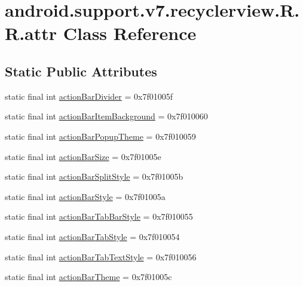 \hypertarget{classandroid_1_1support_1_1v7_1_1recyclerview_1_1_r_1_1attr}{
\section{android.support.v7.recyclerview.R.R.attr Class Reference}
\label{classandroid_1_1support_1_1v7_1_1recyclerview_1_1_r_1_1attr}
}
\subsection*{Static Public Attributes}
\begin{CompactItemize}
\item 
static final int \hyperlink{classandroid_1_1support_1_1v7_1_1recyclerview_1_1_r_1_1attr_149527b51d5ba177533c5cbede5ad832}{actionBarDivider} = 0x7f01005f
\item 
static final int \hyperlink{classandroid_1_1support_1_1v7_1_1recyclerview_1_1_r_1_1attr_90ccaf7c1a106421aefd14f90295f8bb}{actionBarItemBackground} = 0x7f010060
\item 
static final int \hyperlink{classandroid_1_1support_1_1v7_1_1recyclerview_1_1_r_1_1attr_88c7b9a3173d079277200b53ff537fa8}{actionBarPopupTheme} = 0x7f010059
\item 
static final int \hyperlink{classandroid_1_1support_1_1v7_1_1recyclerview_1_1_r_1_1attr_ef4ee19c5633711137823266c474a8a7}{actionBarSize} = 0x7f01005e
\item 
static final int \hyperlink{classandroid_1_1support_1_1v7_1_1recyclerview_1_1_r_1_1attr_fd2393d3d3d7b75789dcc023abac3bc3}{actionBarSplitStyle} = 0x7f01005b
\item 
static final int \hyperlink{classandroid_1_1support_1_1v7_1_1recyclerview_1_1_r_1_1attr_3aee379822bd15fa1f3e4c52563fff25}{actionBarStyle} = 0x7f01005a
\item 
static final int \hyperlink{classandroid_1_1support_1_1v7_1_1recyclerview_1_1_r_1_1attr_f3efc189fc78e993767812aaad2108a2}{actionBarTabBarStyle} = 0x7f010055
\item 
static final int \hyperlink{classandroid_1_1support_1_1v7_1_1recyclerview_1_1_r_1_1attr_62fdaa84b2319076d374cc0136e84e1c}{actionBarTabStyle} = 0x7f010054
\item 
static final int \hyperlink{classandroid_1_1support_1_1v7_1_1recyclerview_1_1_r_1_1attr_66af78d60997ce5b686fc3b4a2f2f84c}{actionBarTabTextStyle} = 0x7f010056
\item 
static final int \hyperlink{classandroid_1_1support_1_1v7_1_1recyclerview_1_1_r_1_1attr_7acb2903babd541e6919c6beaed72325}{actionBarTheme} = 0x7f01005c

\end{CompactItemize}
